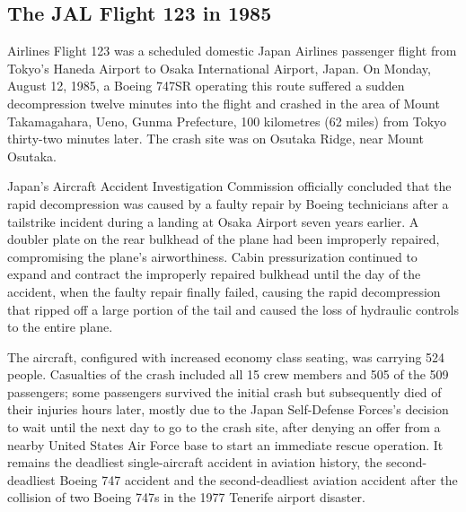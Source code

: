 \documentclass[a4paper,10pt]{article}
\begin{document}
\subsection{The JAL Flight 123 in 1985}
Airlines Flight 123 was a scheduled domestic Japan Airlines passenger flight from Tokyo's Haneda Airport to Osaka International Airport, Japan. On Monday, August 12, 1985, a Boeing 747SR operating this route suffered a sudden decompression twelve minutes into the flight and crashed in the area of Mount Takamagahara, Ueno, Gunma Prefecture, 100 kilometres (62 miles) from Tokyo thirty-two minutes later. The crash site was on Osutaka Ridge, near Mount Osutaka.\par

Japan's Aircraft Accident Investigation Commission officially concluded that the rapid decompression was caused by a faulty repair by Boeing technicians after a tailstrike incident during a landing at Osaka Airport seven years earlier. A doubler plate on the rear bulkhead of the plane had been improperly repaired, compromising the plane's airworthiness. Cabin pressurization continued to expand and contract the improperly repaired bulkhead until the day of the accident, when the faulty repair finally failed, causing the rapid decompression that ripped off a large portion of the tail and caused the loss of hydraulic controls to the entire plane.\par

The aircraft, configured with increased economy class seating, was carrying 524 people. Casualties of the crash included all 15 crew members and 505 of the 509 passengers; some passengers survived the initial crash but subsequently died of their injuries hours later, mostly due to the Japan Self-Defense Forces’s decision to wait until the next day to go to the crash site, after denying an offer from a nearby United States Air Force base to start an immediate rescue operation. It remains the deadliest single-aircraft accident in aviation history, the second-deadliest Boeing 747 accident and the second-deadliest aviation accident after the collision of two Boeing 747s in the 1977 Tenerife airport disaster.\par
\end{document}
